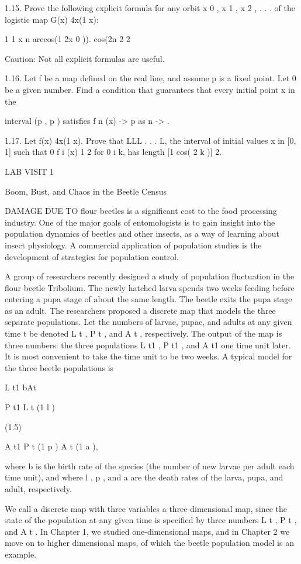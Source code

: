 \documentclass[12pt]{article}
\begin{document}
{1.15. Prove the following explicit formula for any orbit x 0 , x 1 , x 2 , . . .  of the logistic map G(x)  
4x(1  x):

1 1 x n  arccos(1  2x 0 )).  cos(2n  2 2

Caution: Not all explicit formulas are useful.

1.16. Let f be a map defined on the real line, and assume p is a fixed point. Let   0 be a given number. 
Find a condition that guarantees that every initial point x in the

interval (p  , p   ) satisfies f n (x) -> p as n -> .

1.17. Let f(x)  4x(1  x). Prove that LLL . . . L, the interval of initial values x in [0, 1] such that 0  f 
i (x)  1  2 for 0 i  k, has length [1  cos(   2 k )]  2.

LAB VISIT 1

Boom, Bust, and Chaos in the Beetle Census

DAMAGE DUE TO flour beetles is a significant cost to the food processing industry. One of the major goals 
of entomologists is to gain insight into the population dynamics of beetles and other insects, as a way of 
learning about insect physiology. A commercial application of population studies is the development of 
strategies for population control.

A group of researchers recently designed a study of population fluctuation in the flour beetle Tribolium. 
The newly hatched larva spends two weeks feeding before entering a pupa stage of about the same length. The 
beetle exits the pupa stage as an adult. The researchers proposed a discrete map that models the three 
separate populations. Let the numbers of larvae, pupae, and adults at any given time t be denoted L t , P t 
, and A t , respectively. The output of the map is three numbers: the three populations L t1 , P t1 , and A 
t1 one time unit later. It is most convenient to take the time unit to be two weeks. A typical model for 
the three beetle populations is

L t1  bAt 

P t1  L t (1   l )

(1.5)

A t1  P t (1   p )  A t (1   a ),

where b is the birth rate of the species (the number of new larvae per adult each time unit), and where  l 
,  p , and  a are the death rates of the larva, pupa, and adult, respectively.

We call a discrete map with three variables a three-dimensional map, since the state of the population at 
any given time is specified by three numbers L t , P t , and A t . In Chapter 1, we studied one-dimensional 
maps, and in Chapter 2 we move on to higher dimensional maps, of which the beetle population model is an 
example.

}
\end{document}
